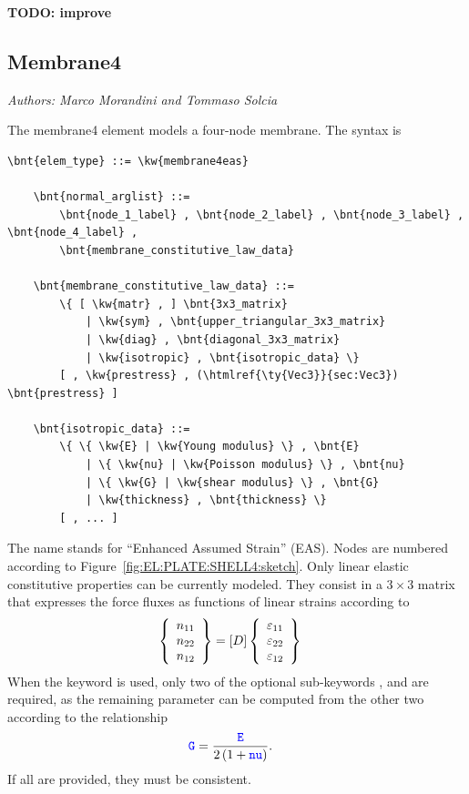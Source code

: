 \textbf{TODO: improve}



\subsection{Membrane4}
\label{sec:EL:PLATE:MEMBRANE4}

\emph{Authors: Marco Morandini and Tommaso Solcia}

The membrane4 element models a four-node membrane.
The syntax is
\begin{Verbatim}[commandchars=\\\{\}]
    \bnt{elem_type} ::= \kw{membrane4eas} 

    \bnt{normal_arglist} ::=
        \bnt{node_1_label} , \bnt{node_2_label} , \bnt{node_3_label} , \bnt{node_4_label} ,
        \bnt{membrane_constitutive_law_data}

    \bnt{membrane_constitutive_law_data} ::=
        \{ [ \kw{matr} , ] \bnt{3x3_matrix}
            | \kw{sym} , \bnt{upper_triangular_3x3_matrix}
            | \kw{diag} , \bnt{diagonal_3x3_matrix}
            | \kw{isotropic} , \bnt{isotropic_data} \}
        [ , \kw{prestress} , (\htmlref{\ty{Vec3}}{sec:Vec3}) \bnt{prestress} ]

    \bnt{isotropic_data} ::=
        \{ \{ \kw{E} | \kw{Young modulus} \} , \bnt{E}
            | \{ \kw{nu} | \kw{Poisson modulus} \} , \bnt{nu}
            | \{ \kw{G} | \kw{shear modulus} \} , \bnt{G}
            | \kw{thickness} , \bnt{thickness} \}
        [ , ... ]
\end{Verbatim}
The name  stands for ``Enhanced Assumed Strain'' (EAS).
Nodes are numbered according to Figure~\ref{fig:EL:PLATE:SHELL4:sketch}.
Only linear elastic constitutive properties can be currently modeled.
They consist in a $3 \times 3$ matrix that expresses the force
fluxes as functions of linear strains according to
\begin{align}
	\left\{ \begin{array}{c} 
		n_{11} \\
		n_{22} \\
		n_{12}
	 \end{array} \right\}
	&=
	\left[ D \right]
	\left\{ \begin{array}{c} 
		\varepsilon_{11} \\
		\varepsilon_{22} \\
		\varepsilon_{12}
	 \end{array} \right\}
\end{align}
When the  keyword is used, only two of the optional
sub-keywords ,  and  are required, as the remaining
parameter can be computed from the other two according to the relationship
\begin{align}
	\textcolor{blue}{\texttt{G}}
	&=
	\frac{\textcolor{blue}{\texttt{E}}}{2\left( 1 + \textcolor{blue}{\texttt{nu}} \right)}
	.
\end{align}
If all are provided, they must be consistent.


